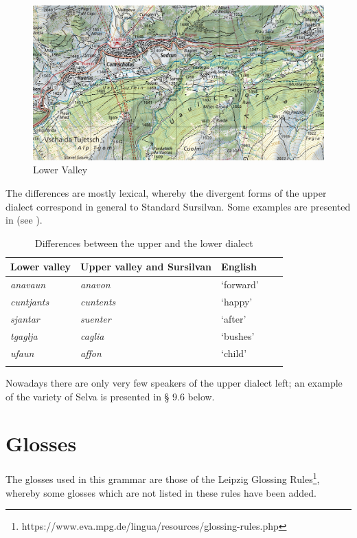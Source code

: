 \begin{figure}
	\includegraphics[height=.4\textheight]{figures/Lower Valley.png}
	\caption{Lower Valley}
	\label{fig:lowervalley}
\end{figure}

The differences are mostly lexical, whereby the divergent forms of the upper dialect correspond in general to Standard Sursilvan. Some examples are presented in  (see \citet[97]{VicHendry2010}).

\begin{table}
	\caption{Differences between the upper and the lower dialect}
	\label{difdial}
	\begin{tabular}{lllll}
		\lsptoprule
		Lower valley &  Upper valley and Sursilvan & English\\
		\midrule
		\textit{anavaun} & \textit{anavon} & `forward' \\
		\textit{cuntjants} & \textit{cuntents} & `happy' \\
		\textit{sjantar} & \textit{suenter} & `after'\\
		\textit{tgaglja} & \textit{caglia} & `bushes'\\
		\textit{ufaun} & \textit{affon} & `child' \\
		\lspbottomrule
	\end{tabular}
\end{table}

Nowadays there are only very few speakers of the upper dialect left; an example of the variety of Selva is presented in § 9.6 below.


\section{Glosses}
The glosses used in this grammar are those of the Leipzig Glossing Rules\footnote{https://www.eva.mpg.de/lingua/resources/glossing-rules.php}, whereby some glosses which are not listed in these rules have been added.

